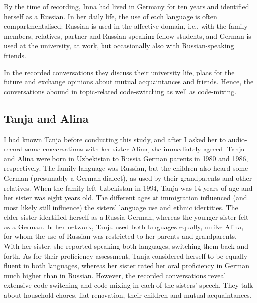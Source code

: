 By the time of recording, Inna had lived in Germany for ten years and identified herself as a Russian. In her daily life, the use of each language is often compartmentalised: Russian is used in the affective domain, i.e., with the family members, relatives, partner and Russian-speaking fellow students, and German is used at the university, at work, but occasionally also with Russian-speaking friends. 

In the recorded conversations they discuss their university life, plans for the future and exchange opinions about mutual acquaintances and friends. Hence, the conversations abound in topic-related code-switching as well as code-mixing.

\subsection{Tanja and Alina}
I had known Tanja before conducting this study, and after I asked her to audio-record some conversations with her sister Alina, she immediately agreed. Tanja and Alina were born in Uzbekistan to Russia German parents in 1980 and 1986, respectively. The family language was Russian, but the children also heard some German (presumably a German dialect), as used by their grandparents and other relatives. When the family left Uzbekistan in 1994, Tanja was 14 years of age and her sister was eight years old. The different ages at immigration influenced (and most likely still influence) the sisters' language use and ethnic identities. The elder sister identified herself as a Russia German, whereas the younger sister felt as a German. In her network, Tanja used both languages equally, unlike Alina, for whom the use of Russian was restricted to her parents and grandparents. With her sister, she reported speaking both languages, switching them back and forth. As for their proficiency assessment, Tanja considered herself to be equally fluent in both languages, whereas her sister rated her oral proficiency in German much higher than in Russian. However, the recorded conversations reveal extensive code-switching and code-mixing in each of the sisters' speech. They talk about household chores, flat renovation, their children and mutual acquaintances.

